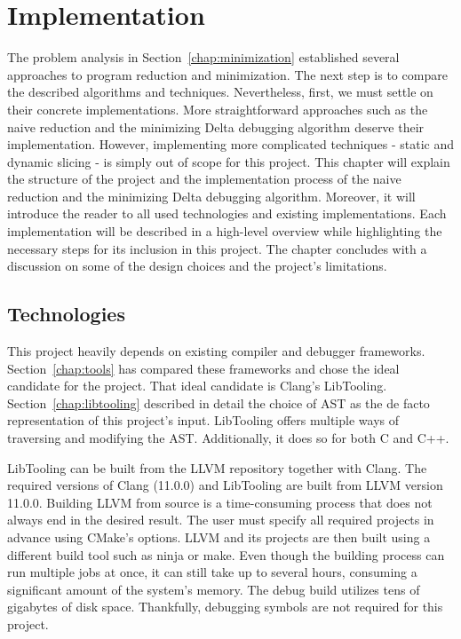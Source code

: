 \chapter{Implementation}


The problem analysis in Section~\ref{chap:minimization} established several 
approaches to program reduction and minimization. 
The next step is to compare the described algorithms and techniques. 
Nevertheless, first, we must settle on their concrete implementations. 
More straightforward approaches such as the naive reduction and 
the minimizing Delta debugging algorithm deserve their implementation. 
However, implementing more complicated techniques - static and dynamic 
slicing - is simply out of scope for this project.
This chapter will explain the structure of the project and the implementation 
process of the naive reduction and the minimizing Delta debugging algorithm. 
Moreover, it will introduce the reader to all used technologies and existing 
implementations. 
Each implementation will be described in a high-level overview while 
highlighting the necessary steps for its inclusion in this project. 
The chapter concludes with a discussion on some of the design choices and 
the project's limitations.

\section{Technologies}

This project heavily depends on existing compiler and debugger frameworks. 
Section~\ref{chap:tools} has compared these frameworks and chose the ideal 
candidate for the project. 
That ideal candidate is Clang's LibTooling. 
Section~\ref{chap:libtooling} described in detail the choice of AST as 
the de facto representation of this project's input. 
LibTooling offers multiple ways of traversing and modifying the AST. 
Additionally, it does so for both C and C++.

LibTooling can be built from the LLVM repository together with Clang.
The required versions of Clang (11.0.0) and LibTooling are built from LLVM 
version 11.0.0.
Building LLVM from source is a time-consuming process that does not always 
end in the desired result.
The user must specify all required projects in advance using CMake's options.
LLVM and its projects are then built using a different build tool such as 
ninja or make.
Even though the building process can run multiple jobs at once, it can still 
take up to several hours, consuming a significant amount of the system's 
memory.
The debug build utilizes tens of gigabytes of disk space.
Thankfully, debugging symbols are not required for this project.

